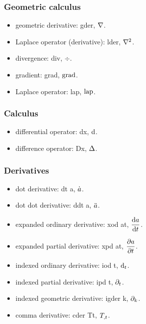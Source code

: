 \subsubsection{Geometric calculus}
\begin{itemize}
\item geometric derivative: gder, $\nabla$.
\item Laplace operator (derivative): lder, $\nabla^2$.
\item divergence: div, $\div$.
\item gradient: grad, $\operatorname{grad}$.
\item Laplace operator: lap, $\operatorname{lap}$.
\end{itemize}


\subsubsection{Calculus}
\begin{itemize}
\item differential operator: dx, $\text{d}$.
\item difference operator: Dx, $\Delta$.
\end{itemize}


\subsubsection{Derivatives}
\begin{itemize}
\item dot derivative: dt a, $\dot{a}$.
\item dot dot derivative: ddt a, $\ddot{a}$.
\item expanded ordinary derivative: xod at, $\dfrac{\text{d}{a}}{\text{d}{t}}$.
\item expanded partial derivative: xpd at, $\dfrac{\partial{a}}{\partial{t}}$.
\item indexed ordinary derivative: iod t, $\text{d}_{t}$.
\item indexed partial derivative: ipd t, $\partial_{t}$.
\item indexed geometric derivative: igder k, $\partial_{k}$.
\item comma derivative: cder Tt, ${T}_{,t}$.
\end{itemize}



